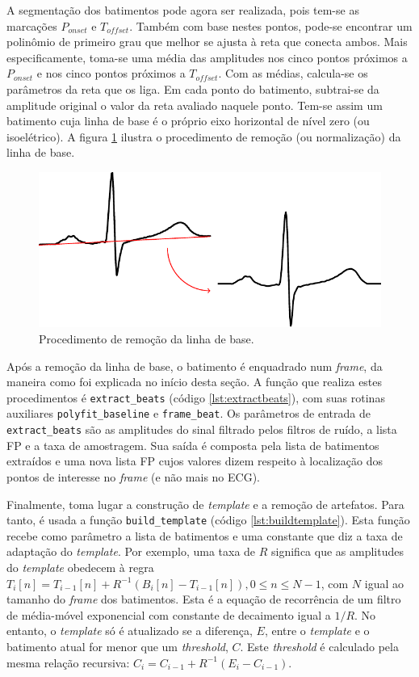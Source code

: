 A segmentação dos batimentos pode agora ser realizada, pois tem-se as marcações $P_{onset}$ e $T_{offset}$. Também com base nestes pontos, pode-se encontrar um polinômio de primeiro grau que melhor se ajusta à reta que conecta ambos. Mais especificamente, toma-se uma média das amplitudes nos cinco pontos próximos a $P_{onset}$ e nos cinco pontos próximos a $T_{offset}$. Com as médias, calcula-se os parâmetros da reta que os liga. Em cada ponto do batimento, subtrai-se da amplitude original o valor da reta avaliado naquele ponto. Tem-se assim um batimento cuja linha de base é o próprio eixo horizontal de nível zero (ou isoelétrico). A figura \ref{fig:baseline} ilustra o procedimento de remoção (ou normalização) da linha de base.

\begin{figure}[ht]
    \centering
    \includegraphics[width=400pt]{figures/chap6-baseline-removal.pdf}
    \caption[Procedimento de remoção da linha de base]{Procedimento de remoção da linha de base.}
    \label{fig:baseline}
\end{figure}

Após a remoção da linha de base, o batimento é enquadrado num \emph{frame}, da maneira como foi explicada no início desta seção. A função que realiza estes procedimentos é \texttt{extract\_beats} (código \ref{lst:extractbeats}), com suas rotinas auxiliares \texttt{polyfit\_baseline} e \texttt{frame\_beat}. Os parâmetros de entrada de \texttt{extract\_beats} são as amplitudes do sinal filtrado pelos filtros de ruído, a lista FP e a taxa de amostragem. Sua saída é composta pela lista de batimentos extraídos e uma nova lista FP cujos valores dizem respeito à localização dos pontos de interesse no \emph{frame} (e não mais no ECG).

Finalmente, toma lugar a construção de \emph{template} e a remoção de artefatos. Para tanto, é usada a função \texttt{build\_template} (código \ref{lst:buildtemplate}). Esta função recebe como parâmetro a lista de batimentos e uma constante que diz a taxa de adaptação do \emph{template}. Por exemplo, uma taxa de $R$ significa que as amplitudes do \emph{template} obedecem à regra $T_i[n] = T_{i-1}[n] + R^{-1}\left(B_i[n] - T_{i-1}[n]\right), 0 \leq n \leq N-1$, com $N$ igual ao tamanho do \emph{frame} dos batimentos. Esta é a equação de recorrência de um filtro de média-móvel exponencial com constante de decaimento igual a $1/R$. No entanto, o \emph{template} só é atualizado se a diferença, $E$, entre o \emph{template} e o batimento atual for menor que um \emph{threshold}, $C$. Este \emph{threshold} é calculado pela mesma relação recursiva: $C_i = C_{i-1} + R^{-1}\left(E_i - C_{i-1}\right)$.

